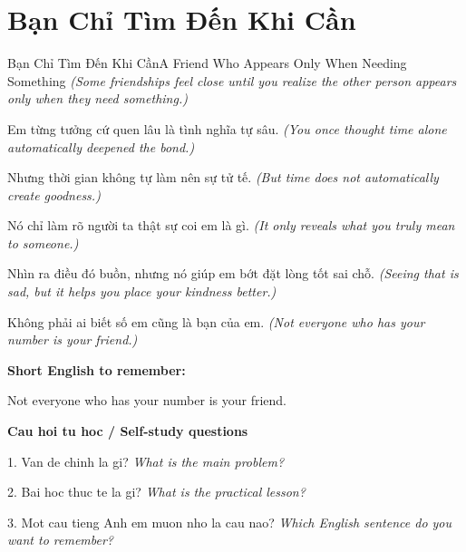 \section{Bạn Chỉ Tìm Đến Khi Cần}
\begin{truyen}{Bạn Chỉ Tìm Đến Khi Cần}{A Friend Who Appears Only When Needing Something}
\textit{(Some friendships feel close until you realize the other person appears only when they need something.)}

Em từng tưởng cứ quen lâu là tình nghĩa tự sâu.
\textit{(You once thought time alone automatically deepened the bond.)}

Nhưng thời gian không tự làm nên sự tử tế.
\textit{(But time does not automatically create goodness.)}

Nó chỉ làm rõ người ta thật sự coi em là gì.
\textit{(It only reveals what you truly mean to someone.)}

Nhìn ra điều đó buồn, nhưng nó giúp em bớt đặt lòng tốt sai chỗ.
\textit{(Seeing that is sad, but it helps you place your kindness better.)}

\end{truyen}

\begin{baihoc}
Không phải ai biết số em cũng là bạn của em.
\textit{(Not everyone who has your number is your friend.)}
\end{baihoc}

\begin{ghinhoanh}
\textbf{Short English to remember:}

Not everyone who has your number is your friend.

\end{ghinhoanh}

\begin{tuhocnhanh}
\textbf{Cau hoi tu hoc / Self-study questions}

1. Van de chinh la gi? \textit{What is the main problem?}

2. Bai hoc thuc te la gi? \textit{What is the practical lesson?}

3. Mot cau tieng Anh em muon nho la cau nao? \textit{Which English sentence do you want to remember?}
\end{tuhocnhanh}
\ngancach

